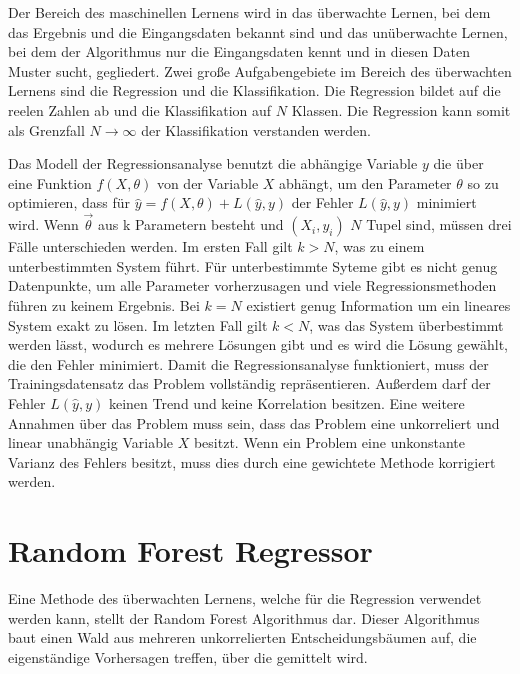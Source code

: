 Der Bereich des maschinellen Lernens wird in das überwachte Lernen, bei dem das Ergebnis und die Eingangsdaten bekannt
sind und das unüberwachte Lernen, bei dem der Algorithmus nur die Eingangsdaten kennt und in diesen Daten Muster sucht, gegliedert.
Zwei große Aufgabengebiete im Bereich des überwachten Lernens sind die Regression und die Klassifikation. Die Regression bildet
auf die reelen Zahlen ab und die Klassifikation auf $N$ Klassen.
Die Regression kann somit als Grenzfall $N \to \infty$ der Klassifikation verstanden werden.

Das Modell der Regressionsanalyse benutzt die abhängige Variable $y$ die über eine Funktion $f(X,\theta)$ von der Variable $X$ abhängt, um
den Parameter $\theta$ so zu optimieren, dass für $\hat{y} = f(X,\theta) + L(\hat{y},y)$ der Fehler
$L(\hat{y},y)$ minimiert wird.
Wenn $\vec{\theta}$ aus k Parametern besteht und $(X_i,y_i)$ $N$ Tupel sind, müssen drei Fälle unterschieden werden.
Im ersten Fall gilt $k>N$, was zu einem unterbestimmten System führt.
Für unterbestimmte Syteme gibt es nicht genug Datenpunkte, um alle Parameter vorherzusagen und viele Regressionsmethoden
führen zu keinem Ergebnis.
Bei $k = N$ existiert genug Information um ein lineares System exakt zu lösen.
Im letzten Fall gilt $k<N$, was das System überbestimmt werden lässt, wodurch es mehrere Lösungen gibt und
es wird die Lösung gewählt, die den Fehler minimiert.
Damit die Regressionsanalyse funktioniert, muss der Trainingsdatensatz das Problem vollständig repräsentieren. Außerdem darf der Fehler $L(\hat{y},y)$ keinen Trend
und keine Korrelation besitzen.
Eine weitere Annahmen über das Problem muss sein, dass das Problem eine unkorreliert und linear unabhängig Variable $X$ besitzt.
Wenn ein Problem eine unkonstante Varianz des Fehlers besitzt, muss dies durch eine gewichtete Methode korrigiert werden.

\section{Random Forest Regressor}

Eine Methode des überwachten Lernens, welche für die Regression verwendet werden kann, stellt der Random Forest Algorithmus dar. Dieser Algorithmus baut
einen Wald aus mehreren unkorrelierten Entscheidungsbäumen auf, die eigenständige Vorhersagen treffen, über die gemittelt wird.

